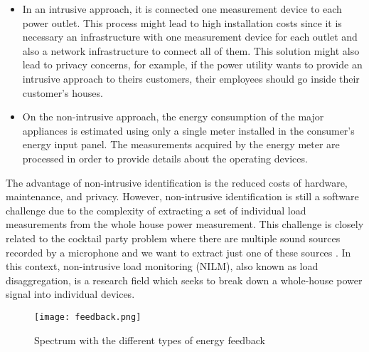 \begin{itemize}
\item In an intrusive approach, it is connected one measurement device to each power outlet. This process might lead to high installation costs since it is necessary an infrastructure with one measurement device for each outlet and also a network infrastructure to connect all of them. This solution might also lead to privacy concerns, for example, if the power utility wants to provide an intrusive approach to theirs customers, their employees should go inside their customer's houses. 
\item On the non-intrusive approach, the energy consumption of the major appliances is estimated using only a single meter installed in the consumer’s energy input panel. The measurements acquired by the energy meter are processed in order to provide details about the operating devices.
\end{itemize}

The advantage of non-intrusive identification is the reduced costs of hardware, maintenance, and privacy. However, non-intrusive identification is still a software challenge due to the complexity of extracting a set of individual load measurements from the whole house power measurement. This challenge is closely related to the cocktail party problem where there are multiple sound sources recorded by a microphone and we want to extract just one of these sources \cite{ica}. In this context, non-intrusive load monitoring (NILM), also known as load disaggregation, is a research field which seeks to break down a whole-house power signal into individual devices.

\begin{figure}[tb]
    \centering
    \texttt{[image: feedback.png]}
    \caption{Spectrum with the different types of energy feedback \cite{epri}}
    \label{feedback}
\end{figure}

